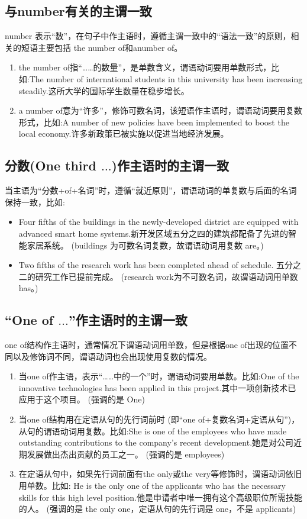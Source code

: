 \subsection{与number有关的主谓一致}

number 表示“数”，在句子中作主语时，遵循主谓一致中的“语法一致”的原则，相关的短语主要包括 the number of和anumber of。
\begin{enumerate}
  \item the number of指“……的数量”，是单数含义，谓语动词要用单数形式，比如:The number of international students in this university has been increasing steadily.这所大学的国际学生数量在稳步增长。
  \item a number of意为“许多”，修饰可数名词，该短语作主语时，谓语动词要用复数形式，比如:A number of new policies have been implemented to boost the local economy.许多新政策已被实施以促进当地经济发展。
\end{enumerate}

\subsection{分数(One third \(\ldots\))作主语时的主谓一致}

当主语为“分数+of+名词”时，遵循“就近原则”，谓语动词的单复数与后面的名词保持一致，比如:
\begin{itemize}
  \item Four fifths of the buildings in the newly-developed district are equipped with advanced smart home systems.新开发区域五分之四的建筑都配备了先进的智能家居系统。 (buildings 为可数名词复数，故谓语动词用复数 are。)
  \item Two fifths of the research work has been completed ahead of schedule. 五分之二的研究工作已提前完成。 (research work为不可数名词，故谓语动词用单数has。)
\end{itemize}

\subsection{“One of \(\ldots\)”作主语时的主谓一致}

one of结构作主语时，通常情况下谓语动词用单数，但是根据one of出现的位置不同以及修饰词不同，谓语动词也会出现使用复数的情况。
\begin{enumerate}
  \item 当one of作主语，表示“……中的一个”时，谓语动词要用单数。比如:One of the innovative technologies has been applied in this project.其中一项创新技术已应用于这个项目。 (强调的是 One)
  \item 当one of结构用在定语从句的先行词前时 (即“one of+复数名词+定语从句”)，从句的谓语动词用复数。比如:She is one of the employees who have made outstanding contributions to the company's recent development.她是对公司近期发展做出杰出贡献的员工之一。 (强调的是 employees)
  \item 在定语从句中，如果先行词前面有the only或the very等修饰时，谓语动词依旧用单数。比如: He is the only one of the applicants who has the necessary skills for this high level position.他是申请者中唯一拥有这个高级职位所需技能的人。 (强调的是 the only one，定语从句的先行词是 one，不是 applicants)
\end{enumerate}

